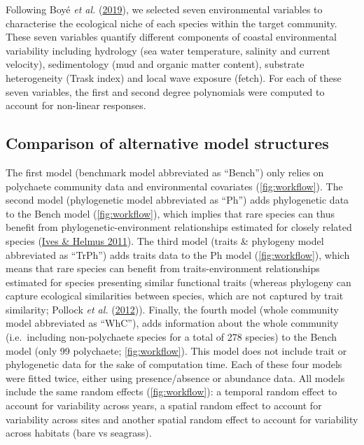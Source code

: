 \documentclass[9pt,biorxiv,doublespacing,lineno]{lapreprint}
\begin{document}
Following Boyé \emph{et al.} (\protect\hyperlink{ref-Boye_2019a}{2019}),
we selected seven environmental variables to characterise the ecological
niche of each species within the target community. These seven variables
quantify different components of coastal environmental variability
including hydrology (sea water temperature, salinity and current
velocity), sedimentology (mud and organic matter content), substrate
heterogeneity (Trask index) and local wave exposure (fetch). For each of
these seven variables, the first and second degree polynomials were
computed to account for non-linear responses.

\hypertarget{comparison-of-alternative-model-structures}{%
\subsection{Comparison of alternative model
structures}\label{comparison-of-alternative-model-structures}}

The first model (benchmark model abbreviated as ``Bench'') only relies
on polychaete community data and environmental covariates
(\cref{fig:workflow}). The second model (phylogenetic model abbreviated
as ``Ph'') adds phylogenetic data to the Bench model
(\cref{fig:workflow}), which implies that rare species can thus benefit
from phylogenetic-environment relationships estimated for closely
related species (\protect\hyperlink{ref-Ives_2011}{Ives \& Helmus
2011}). The third model (traits \& phylogeny model abbreviated as
``TrPh'') adds traits data to the Ph model (\cref{fig:workflow}), which
means that rare species can benefit from traits-environment
relationships estimated for species presenting similar functional traits
(whereas phylogeny can capture ecological similarities between species,
which are not captured by trait similarity; Pollock \emph{et al.}
(\protect\hyperlink{ref-Pollock_2012}{2012})). Finally, the fourth model
(whole community model abbreviated as ``WhC''), adds information about
the whole community (i.e.~including non-polychaete species for a total
of 278 species) to the Bench model (only 99 polychaete;
\cref{fig:workflow}). This model does not include trait or phylogenetic
data for the sake of computation time. Each of these four models were
fitted twice, either using presence/absence or abundance data. All
models include the same random effects (\cref{fig:workflow}): a temporal
random effect to account for variability across years, a spatial random
effect to account for variability across sites and another spatial
random effect to account for variability across habitats (bare vs
seagrass).
\end{document}
